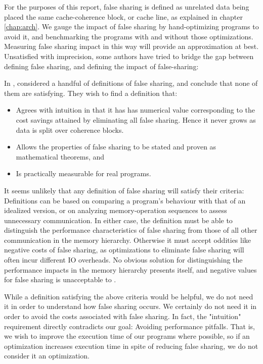 For the purposes of this report, false sharing is defined as unrelated data
being placed the same cache-coherence block, or cache line, as explained in
chapter \ref{chap:arch}. We gauge the impact of false sharing by hand-optimizing
programs to avoid it, and benchmarking the programs with and without those
optimizations. Measuring false sharing impact in this way will provide an
approximation at best. Unsatisfied with imprecision, some authors have tried to
bridge the gap between defining false sharing, and defining the impact of
false-sharing:

In \citeyear{falsedef}, \citeauthor{falsedef} \cite{falsedef} considered a handful
of definitions of false sharing, and conclude that none of them are satisfying.
They wish to find a definition that:

\begin{itemize}
	\item Agrees with intuition in that it has has numerical value
		corresponding to the cost savings attained by eliminating all
		false sharing. Hence it never grows as data is split over
		coherence blocks.
	\item Allows the properties of false sharing to be stated and proven as
		mathematical theorems, and
	\item Is practically measurable for real programs.
\end{itemize}

It seems unlikely that any definition of false sharing will satisfy their
criteria: Definitions can be based on comparing a program's
behaviour with that of an idealized version\footnotemark, or on analyzing
memory-operation sequences to assess unnecessary communication. In either case,
the definition must be able to distinguish the performance characteristics of false
sharing from those of all other communication in the memory hierarchy. Otherwise
it must accept oddities like negative costs of false sharing, as optimizations
to eliminate false sharing will often incur different IO overheads. No obvious
solution for distinguishing the performance impacts in the memory hierarchy
presents itself, and negative values for false sharing is unacceptable to
\citeauthor{falsedef}.

While a definition satisfying the above criteria would be helpful, we do not
need it in order to understand how false sharing occurs. We certainly
do not need it in order to avoid the costs associated with false sharing. In
fact, the "intuition" requirement directly contradicts our goal: Avoiding
performance pitfalls. That is, we wish to improve the execution time of our
programs where possible, so if an optimization increases execution time in spite
of reducing false sharing, we do not consider it an optimization.

